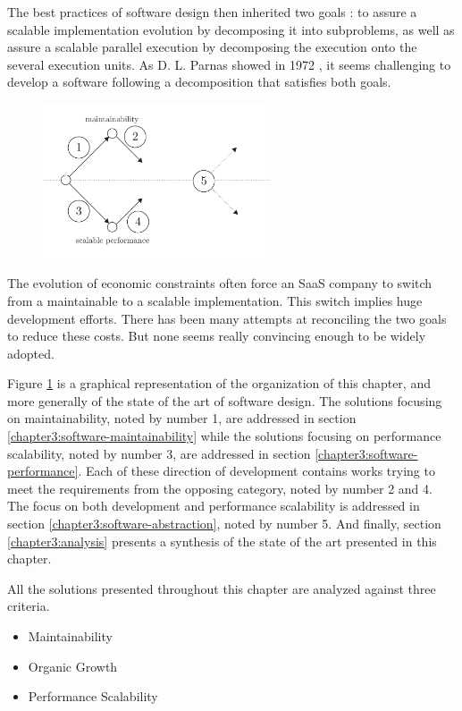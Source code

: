 The best practices of software design then inherited two goals : to assure a scalable implementation evolution by decomposing it into subproblems, as well as assure a scalable parallel execution by decomposing the execution onto the several execution units.
As D. L. Parnas showed in 1972 \cite{Parnas1972}, it seems challenging to develop a software following a decomposition that satisfies both goals.

\begin{figure}[h!] \label{fig:state-of-the-art}
\begin{center}
\includegraphics[width=0.6\textwidth]{../ressources/state-of-the-art.pdf}
\end{center}
\end{figure}

The evolution of economic constraints often force an SaaS company to switch from a maintainable to a scalable implementation.
This switch implies huge development efforts.
There has been many attempts at reconciling the two goals to reduce these costs.
But none seems really convincing enough to be widely adopted.

Figure \ref{fig:state-of-the-art} is a graphical representation of the organization of this chapter, and more generally of the state of the art of software design.
The solutions focusing on maintainability, noted by number 1, are addressed in section \ref{chapter3:software-maintainability} while the solutions focusing on performance scalability, noted by number 3, are addressed in section \ref{chapter3:software-performance}.
Each of these direction of development contains works trying to meet the requirements from the opposing category, noted by number 2 and 4.
The focus on both development and performance scalability is addressed in section \ref{chapter3:software-abstraction}, noted by number 5.
And finally, section \ref{chapter3:analysis} presents a synthesis of the state of the art presented in this chapter.

All the solutions presented throughout this chapter are analyzed against three criteria.
\begin{itemize}
\item Maintainability
\item Organic Growth
\item Performance Scalability
\end{itemize}

